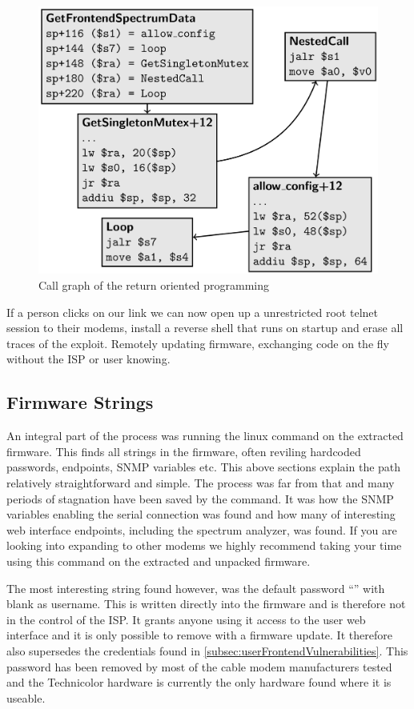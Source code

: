 \begin{figure}[ht]
  \includegraphics[width=\linewidth]{graphics/returnorientedprogramming}
  \caption{Call graph of the return oriented programming}
  \label{fig:returnOrientedProgramming}
\end{figure}

If a person clicks on our link we can now open up a unrestricted root telnet session to their modems, install a reverse shell that runs on startup and erase all traces of the exploit.
Remotely updating firmware, exchanging code on the fly without the ISP or user knowing.

\subsection{Firmware Strings}
An integral part of the process was running the linux command  on the extracted firmware.
This finds all strings in the firmware, often reviling hardcoded passwords, endpoints, SNMP variables etc.
This above sections explain the path relatively straightforward and simple.
The process was far from that and many periods of stagnation have been saved by the command.
It was how the SNMP variables enabling the serial connection was found and how many of interesting web interface endpoints, including the spectrum analyzer, was found.
If you are looking into expanding \exploitname{} to other modems we highly recommend taking your time using this command on the extracted and unpacked firmware.

The most interesting string found however, was the default password \enquote{} with blank as username.
This is written directly into the firmware and is therefore not in the control of the ISP.
It grants anyone using it access to the user web interface and it is only possible to remove with a firmware update.
It therefore also supersedes the credentials found in \cref{subsec:userFrontendVulnerabilities}.
This password has been removed by most of the cable modem manufacturers tested and the Technicolor hardware is currently the only hardware found where it is useable.

